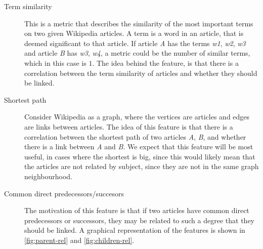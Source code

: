 \begin{description}
    \item[Term similarity] This is a metric that describes the similarity of the most important terms on two given Wikipedia articles. A term is a word in an article, that is deemed significant to that article. If article \emph{A} has the terms \emph{w1}, \emph{w2}, \emph{w3} and article \emph{B} has \emph{w3}, \emph{w4}, a metric could be the number of similar terms, which in this case is $1$. The idea behind the feature, is that there is a correlation between the term similarity of articles and whether they should be linked.
    \item[Shortest path] Consider Wikipedia as a graph, where the vertices are articles and edges are links between articles. The idea of this feature is that there is a correlation between the shortest path of two articles \emph{A}, \emph{B}, and whether there is a link between \emph{A} and \emph{B}. We expect that this feature will be most useful, in cases where the shortest is big, since this would likely mean that the articles are not related by subject, since they are not in the same graph neighbourhood.
    \item[Common direct predecessors/succesors] The motivation of this feature is that if two articles have common direct predecessors or successors, they may be related to such a degree that they should be linked. A graphical representation of the features is shown in \cref{fig:parent-rel} and \cref{fig:children-rel}.
\end{description}

